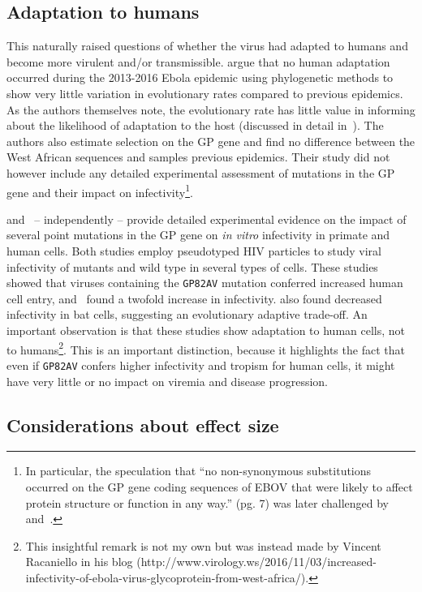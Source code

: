 \subsection{Adaptation to humans}

This naturally raised questions of whether the virus had adapted to humans and become more virulent and/or transmissible.
\cite{Li2016} argue that no human adaptation occurred during the 2013-2016 Ebola epidemic using phylogenetic methods to show very little variation in evolutionary rates compared to previous epidemics.
As the authors themselves note, the evolutionary rate has little value in informing about the likelihood of adaptation to the host (discussed in detail in~\cite{Holmes2016}).
The authors also estimate selection on the GP gene and find no difference between the West African sequences and samples previous epidemics.
Their study did not however include any detailed experimental assessment of mutations in the GP gene and their impact on infectivity\footnote{In particular, the speculation that ``no non-synonymous substitutions occurred
on the GP gene coding sequences of EBOV that were likely to affect protein structure or function in any way.'' (pg. 7) was later challenged by~\cite{Urbanowicz2016} and~\cite{Diehl2016}.}.

\cite{Urbanowicz2016} and~\cite{Diehl2016} -- independently -- provide detailed experimental evidence on the impact of several point mutations in the GP gene on \textit{in vitro} infectivity in primate and human cells.
Both studies employ pseudotyped HIV particles to study viral infectivity of mutants and wild type in several types of cells.
These studies showed that viruses containing the \verb|GP82AV| mutation conferred increased human cell entry, and~\cite{Diehl2016} found a twofold increase in infectivity.
\cite{Urbanowicz2016} also found decreased infectivity in bat cells, suggesting an evolutionary adaptive trade-off.
An important observation is that these studies show adaptation to human cells, not to humans\footnote{This insightful remark is not my own but was instead made by Vincent Racaniello in his blog (http://www.virology.ws/2016/11/03/increased-infectivity-of-ebola-virus-glycoprotein-from-west-africa/).}.
This is an important distinction, because it highlights the fact that even if \verb|GP82AV| confers higher infectivity and tropism for human cells, it might have very little or no impact on viremia and disease progression. 

\subsection{Considerations about effect size}

